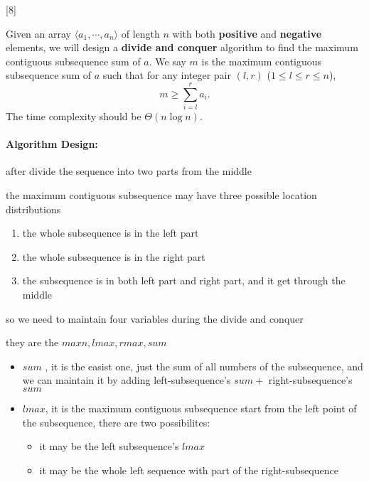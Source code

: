[8]

Given an array $\langle a_1,\cdots,a_n\rangle$ of length $n$ with both \textbf{positive} and \textbf{negative} elements, we will design a \textbf{divide and conquer} algorithm to find the maximum contiguous subsequence sum of $a$. We say $m$ is the  maximum contiguous subsequence sum of $a$ such that for any integer pair $(l,r)$ ($1 \le l \le r \le n$), 
$$
m \ge \sum_{i = l} ^ r a_i.
$$
The time complexity should be $\Theta(n \log n)$.
\begin{solution}
\paragraph{Algorithm Design:} 
after divide the sequence into two parts from the middle

the maximum contiguous subsequence may have three possible location distributions
\begin{enumerate}
	\item the whole subsequence is in the left part
	\item the whole subsequence is in the right part
	\item the subsequence is in both left part and right part, and it get through the middle
\end{enumerate}

\iffalse
so we need to maintain four variables during the divide and conquer

they are the $maxn, lmax, rmax, sum$

\begin{itemize}
	\item $sum$ , it is the easist one, just the sum of all numbers of the subsequence,
	and we can maintain it by adding left-subsequence's $sum+$ right-subsequence's $sum$

	\item $lmax$, it is the maximum contiguous subsequence start from the left point of the subsequence,
	there are two possibilites:
	
	\begin{itemize}
		\item it may be the left subsequence's $lmax$
		\item it may be the whole left sequence with part of the right-subsequence
	\end{itemize}
	

\end{itemize}
\end{solution}
